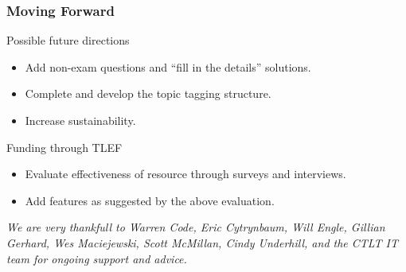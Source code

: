 \documentclass{beamer}
\begin{document}

\frame
{ \frametitle{\bf{Moving Forward}}
    \begin{block}{Possible future directions}
      \begin{itemize}
            \item Add non-exam questions and ``fill in the details'' solutions.
            \item Complete and develop the topic tagging structure.
            \item Increase sustainability.
       \end{itemize}
    \end{block}
    \begin{block}{Funding through TLEF}
        \begin{itemize}
            \item Evaluate effectiveness of resource through surveys and interviews.
            \item Add features as suggested by the above evaluation.
       \end{itemize}
    \end{block}

\emph{We are very thankfull to Warren Code, Eric Cytrynbaum, Will Engle, Gillian Gerhard, Wes Maciejewski, Scott McMillan, Cindy Underhill, and the CTLT IT team for ongoing support and advice.}
}
\end{document}
